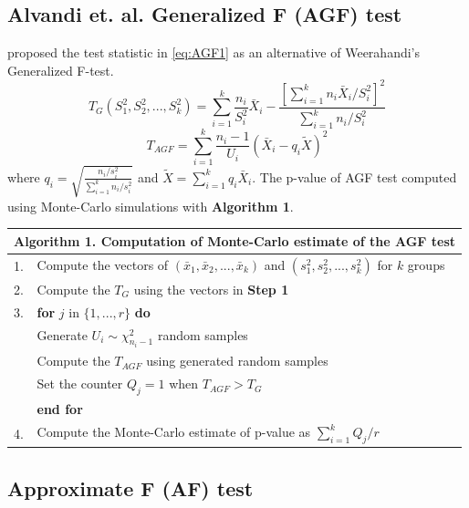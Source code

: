 \subsection{Alvandi et. al. Generalized F (AGF) test}

\cite{alvandi:2012} proposed the test statistic in \ref{eq:AGF1} as an alternative of Weerahandi’s Generalized F-test.
\begin{equation}
T_G(S_1^2, S_2^2, ..., S_k^2)=\sum_{i=1}^k \frac{n_i}{S_i^2}\bar{X}_i-\frac{[\sum_{i=1}^k n_i\bar{X}_i/S_i^2]^2}{\sum_{i=1}^k n_i/S_i^2} 
\end{equation}
\begin{equation}
T_{AGF}=\sum_{i=1}^k \frac{n_i-1}{U_i} (\bar{X}_i-q_i\tilde{X})^2 \label{eq:AGF1}
\end{equation}
where $q_i=\sqrt{\frac{n_i/s_i^2}{\sum_{i=1}^k n_i/s_i^2}}$ and $\tilde{X}=\sum_{i=1}^k q_i \bar{X}_i$. The p-value of AGF test computed using Monte-Carlo simulations with \textbf{Algorithm 1}.

\begin{table}[h]
\centering
\begin{tabular}{ll}\midrule
\multicolumn{2}{l}{\textbf{Algorithm 1.} Computation of Monte-Carlo estimate of the AGF test}\\\midrule
1.&Compute the vectors of $(\bar{x}_1, \bar{x}_2, ..., \bar{x}_k)$ and $(s_1^2, s_2^2, ..., s_k^2)$ for $k$ groups\\
2.&Compute the $T_G$ using the vectors in \textbf{Step 1}\\
3.&\textbf{for} $j$ in $\{1, ..., r\}$ \textbf{do}\\
   &Generate $U_i \sim \chi^2_{n_i-1}$ random samples\\
   &Compute the $T_{AGF}$ using generated random samples\\
   &Set the counter $Q_j=1$ when $T_{AGF}>T_G$\\
   &\textbf{end for}\\
4.&Compute the Monte-Carlo estimate of p-value as $\sum_{i=1}^k Q_j/r$\\\midrule
\end{tabular}
\end{table}
\subsection{Approximate F (AF) test}

